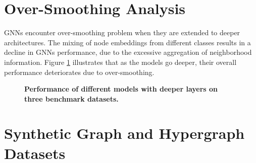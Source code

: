 \documentclass[review]{elsarticle}
\begin{document}
\begin{table}[htbp]
  \centering
  \caption{\textbf{Sensitivity to hidden dimension on \texttt{Pubmed} hypergraph dataset.}}
  \label{table: ab-5}
\end{table}

\section{Over-Smoothing Analysis}

GNNs encounter over-smoothing problem when they are extended to deeper architectures. The mixing of node embeddings from different classes results in a decline in GNNs performance, due to the excessive aggregation of neighborhood information. Figure \ref{fig:q8-9} illustrates that as the models go deeper, their overall performance deteriorates due to over-smoothing.

\begin{figure}[htbp]
  \centering
  \caption{\textbf{Performance of different models with deeper layers on three benchmark datasets.}}
  \label{fig:q8-9}
\end{figure}

\section{Synthetic Graph and Hypergraph Datasets}
\end{document}
